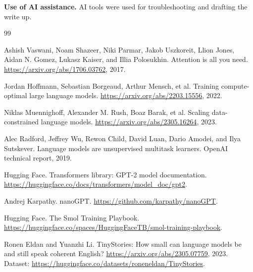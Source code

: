 \documentclass[11pt,a4paper]{article}
\begin{document}
\medskip
\noindent\textbf{Use of AI assistance.} AI tools were used for troubleshooting and drafting the write up.

\begin{thebibliography}{99}

Ashish Vaswani, Noam Shazeer, Niki Parmar, Jakob Uszkoreit, Llion Jones, Aidan N. Gomez, Lukasz Kaiser, and Illia Polosukhin.
Attention is all you need.
\url{https://arxiv.org/abs/1706.03762}, 2017.

Jordan Hoffmann, Sebastian Borgeaud, Arthur Mensch, et al.
Training compute-optimal large language models.
\url{https://arxiv.org/abs/2203.15556}, 2022.

Niklas Muennighoff, Alexander M. Rush, Boaz Barak, et al.
Scaling data-constrained language models.
\url{https://arxiv.org/abs/2305.16264}, 2023.

Alec Radford, Jeffrey Wu, Rewon Child, David Luan, Dario Amodei, and Ilya Sutskever.
Language models are unsupervised multitask learners.
OpenAI technical report, 2019.

Hugging Face.
Transformers library: GPT-2 model documentation.
\url{https://huggingface.co/docs/transformers/model_doc/gpt2}.

Andrej Karpathy.
nanoGPT.
\url{https://github.com/karpathy/nanoGPT}.

Hugging Face.
The Smol Training Playbook.
\url{https://huggingface.co/spaces/HuggingFaceTB/smol-training-playbook}.

Ronen Eldan and Yuanzhi Li.
TinyStories: How small can language models be and still speak coherent English?
\url{https://arxiv.org/abs/2305.07759}, 2023. Dataset: \url{https://huggingface.co/datasets/roneneldan/TinyStories}.

\end{thebibliography}
\end{document}
